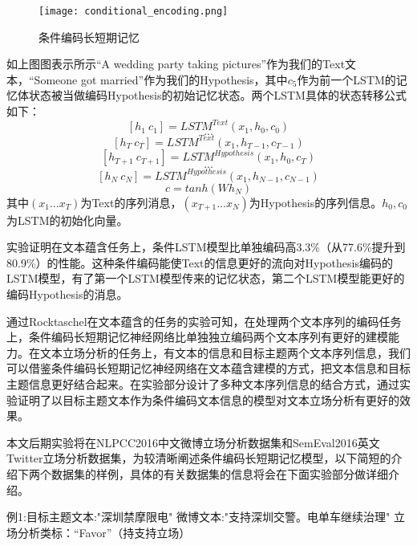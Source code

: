 \begin{figure}[htbp]
	\centering
	\texttt{[image: conditional\_encoding.png]}
	\caption[rnn_vanish]{条件编码长短期记忆}
\end{figure}

如上图图表示所示“A wedding party taking pictures”作为我们的Text文本，“Someone got married”作为我们的Hypothesis，其中$c_5$作为前一个LSTM的记忆体状态被当做编码Hypothesis的初始记忆状态。两个LSTM具体的状态转移公式如下：
\begin{equation}\label{lstm_f}[h_1~c_1] = LSTM^{Text}(x_1,h_0,c_0)\end{equation}
$$...$$
\begin{equation}\label{lstm_f}[h_T~c_T] = LSTM^{Text}(x_1,h_{T-1},c_{T-1})\end{equation}
\begin{equation}\label{lstm_f}[h_{T+1}~c_{T+1}] = LSTM^{Hypothesis}(x_1,h_0,c_T)\end{equation}
$$...$$
\begin{equation}\label{lstm_f}[h_{N}~c_{N}] = LSTM^{Hypothesis}(x_1,h_{N-1},c_{N-1})\end{equation}
\begin{equation}\label{lstm_f}c=tanh(Wh_N)\end{equation}
其中$(x_1...x_T)$为Text的序列消息，$(x_{T+1}...x_N)$为Hypothesis的序列信息。$h_0,c_0$为LSTM的初始化向量。

实验证明在文本蕴含任务上，条件LSTM模型比单独编码高3.3\%（从77.6\%提升到80.9\%）的性能。这种条件编码能使Text的信息更好的流向对Hypothesis编码的LSTM模型，有了第一个LSTM模型传来的记忆状态，第二个LSTM模型能更好的编码Hypothesis的消息。


通过Rocktaschel在文本蕴含的任务的实验可知，在处理两个文本序列的编码任务上，条件编码长短期记忆神经网络比单独独立编码两个文本序列有更好的建模能力。在文本立场分析的任务上，有文本的信息和目标主题两个文本序列信息，我们可以借鉴条件编码长短期记忆神经网络在文本蕴含建模的方式，把文本信息和目标主题信息更好结合起来。在实验部分设计了多种文本序列信息的结合方式，通过实验证明了以目标主题文本作为条件编码文本信息的模型对文本立场分析有更好的效果。

本文后期实验将在NLPCC2016中文微博立场分析数据集和SemEval2016英文Twitter立场分析数据集，为较清晰阐述条件编码长短期记忆模型，以下简短的介绍下两个数据集的样例，具体的有关数据集的信息将会在下面实验部分做详细介绍。

例1:目标主题文本:"深圳禁摩限电" 微博文本:"支持深圳交警。电单车继续治理" 立场分析类标：“Favor”（持支持立场）

